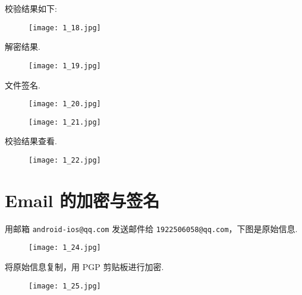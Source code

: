\documentclass[../main.tex]{subfiles}
\begin{document}
校验结果如下:
\begin{figure}[H]
  \begin{center}
    \texttt{[image: 1\_18.jpg]}
  \end{center}
\end{figure}

解密结果.
\begin{figure}[H]
  \begin{center}
    \texttt{[image: 1\_19.jpg]}
  \end{center}
\end{figure}

文件签名.
\begin{figure}[H]
  \begin{center}
    \texttt{[image: 1\_20.jpg]}
  \end{center}
\end{figure}
\begin{figure}[H]
  \begin{center}
    \texttt{[image: 1\_21.jpg]}
  \end{center}
\end{figure}

校验结果查看.
\begin{figure}[H]
  \begin{center}
    \texttt{[image: 1\_22.jpg]}
  \end{center}
\end{figure}
%
\section{Email 的加密与签名}
用邮箱 \texttt{android-ios@qq.com} 发送邮件给
\texttt{1922506058@qq.com}，下图是原始信息.
\begin{figure}[H]
  \begin{center}
    \texttt{[image: 1\_24.jpg]}
  \end{center}
\end{figure}

将原始信息复制，用 PGP 剪贴板进行加密.
\begin{figure}[H]
  \begin{center}
    \texttt{[image: 1\_25.jpg]}
  \end{center}
\end{figure}
\end{document}
